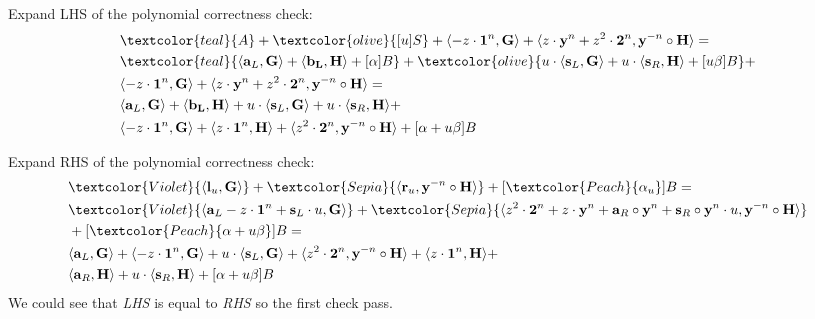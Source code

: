 \documentclass[../lecture-notes-148x210.tex]{subfiles}
\begin{document}
Expand LHS of the polynomial correctness check:
\begin{equation*}
    \begin{aligned}
        &\textcolor{teal}{A} + \textcolor{olive}{[u]S} + \langle -z \cdot \mathbf{1}^n, \mathbf{G} \rangle + \langle z \cdot \mathbf{y}^n + z^2 \cdot \mathbf{2}^n, \mathbf{y}^{-n} \circ \mathbf{H} \rangle = \\
        &\textcolor{teal}{\langle \mathbf{a}_L, \mathbf{G} \rangle + \langle \mathbf{b_L}, \mathbf{H} \rangle + [\alpha]B} + \textcolor{olive}{u \cdot \langle \mathbf{s}_L, \mathbf{G} \rangle + u \cdot \langle \mathbf{s}_R, \mathbf{H} \rangle + [u\beta]B} + \\
        & \langle -z \cdot \mathbf{1}^n, \mathbf{G} \rangle + \langle z \cdot \mathbf{y}^n + z^2 \cdot \mathbf{2}^n, \mathbf{y}^{-n} \circ \mathbf{H} \rangle = \\
        &\langle \mathbf{a}_L, \mathbf{G} \rangle + \langle \mathbf{b_L}, \mathbf{H} \rangle + u \cdot \langle \mathbf{s}_L, \mathbf{G} \rangle + u \cdot \langle \mathbf{s}_R, \mathbf{H} \rangle + \\
        &\langle -z \cdot \mathbf{1}^n, \mathbf{G} \rangle + \langle z \cdot \mathbf{1}^n, \mathbf{H} \rangle + \langle z^2 \cdot \mathbf{2}^n, \mathbf{y}^{-n} \circ \mathbf{H} \rangle + [\alpha + u\beta]B
    \end{aligned}
\end{equation*}

Expand RHS of the polynomial correctness check:
\begin{equation*}
    \begin{aligned}
        &\textcolor{Violet}{\langle \mathbf{l}_u, \mathbf{G} \rangle} + \textcolor{Sepia}{\langle \mathbf{r}_u, \mathbf{y}^{-n} \circ \mathbf{H} \rangle} + [\textcolor{Peach}{\alpha_u}]B = \\
        &\textcolor{Violet}{\langle \mathbf{a}_L - z \cdot \mathbf{1}^n + \mathbf{s}_L \cdot u, \mathbf{G} \rangle} + \textcolor{Sepia}{\langle z^2 \cdot \mathbf{2}^n + z \cdot \mathbf{y}^n + \mathbf{a}_R \circ \mathbf{y}^n + \mathbf{s}_R \circ \mathbf{y}^n \cdot u, \mathbf{y}^{-n} \circ \mathbf{H} \rangle} \\ 
        &+ [\textcolor{Peach}{\alpha + u\beta}]B = \\
        & \langle \mathbf{a}_L, \mathbf{G} \rangle + \langle -z \cdot \mathbf{1}^n, \mathbf{G} \rangle + u \cdot \langle \mathbf{s}_L, \mathbf{G} \rangle + \langle z^2 \cdot \mathbf{2}^n, \mathbf{y}^{-n} \circ \mathbf{H} \rangle + \langle z \cdot \mathbf{1}^n, \mathbf{H} \rangle + \\
        & \langle \mathbf{a}_R, \mathbf{H} \rangle + u\cdot \langle \mathbf{s}_R, \mathbf{H} \rangle + [\alpha + u\beta]B
    \end{aligned}
\end{equation*}
We could see that \textit{LHS} is equal to \textit{RHS} so the first check pass. 
\end{document}
